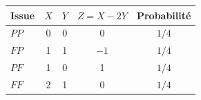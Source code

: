 \begingroup\renewcommand{\arraystretch}{1.35}
\begin{tabular}{@{}lcccc@{}}\toprule
Issue & $X$ & $Y$ & $Z=X-2Y$ & Probabilité\\\midrule
$PP$ & 0 & 0 & 0 & $1/4$\\
$FP$ & 1 & 1 & $-1$ & $1/4$\\
$PF$ & 1 & 0 & 1 & $1/4$\\
$FF$ & 2 & 1 & 0 & $1/4$\\
\bottomrule\end{tabular}\endgroup

\par\smallskip{}
